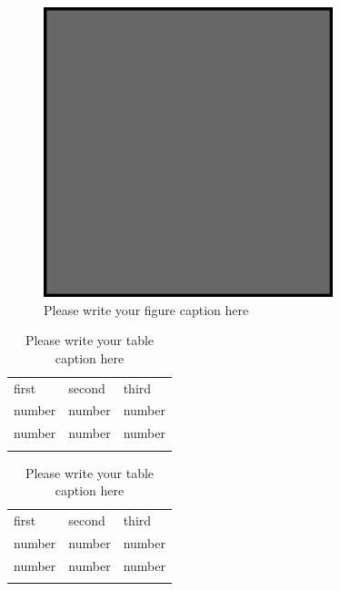 \begin{figure}
  \includegraphics[width=0.75\textwidth]{example.eps}
\caption{Please write your figure caption here}
\label{fig:2}       %
\end{figure}
%
\begin{landscape}

\begin{table}
\caption{Please write your table caption here}
\label{tab:1}       %
\begin{tabular}{lll}
\hline\noalign{\smallskip}
first & second & third  \\
\noalign{\smallskip}\hline\noalign{\smallskip}
number & number & number \\
number & number & number \\
\noalign{\smallskip}\hline
\end{tabular}
\end{table}

\begin{table}
\caption{Please write your table caption here}
\label{tab:2}       %
\begin{tabular}{lll}
\hline\noalign{\smallskip}
first & second & third  \\
\noalign{\smallskip}\hline\noalign{\smallskip}
number & number & number \\
number & number & number \\
\noalign{\smallskip}\hline
\end{tabular}
\end{table}

\end{landscape}
\restoregeometry

